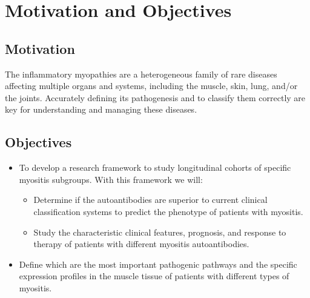 \chapter{Motivation and Objectives}

\section{Motivation}
The inflammatory myopathies are a heterogeneous family of rare diseases affecting multiple organs and systems, including the muscle, skin, lung, and/or the joints.  Accurately defining its pathogenesis and to classify them correctly are key for understanding and managing these diseases.

\section{Objectives}
\begin{itemize}
	
	\item To develop a research framework to study longitudinal cohorts of specific myositis subgroups. With this framework we will:
	\begin{itemize}
		\item Determine if the autoantibodies are superior to current clinical classification systems to predict the phenotype of patients with myositis.
		\item Study the characteristic clinical features, prognosis, and response to therapy of patients with different myositis autoantibodies.
	\end{itemize}
	\item Define which are the most important pathogenic pathways and the specific expression profiles in the muscle tissue of patients with different types of myositis.
\end{itemize}

